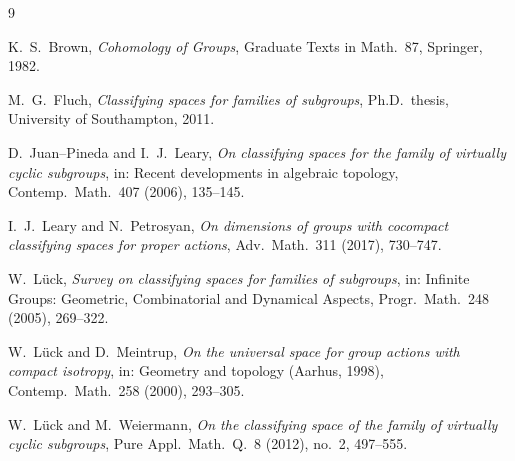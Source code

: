 \documentclass{amsart}
\theoremstyle{definition}
\begin{document}
\begin{thebibliography}{9}

 K.~S.~Brown, \emph{Cohomology of Groups}, Graduate Texts in Math.\ 87,
Springer, 1982.

 M.~G.~Fluch, \emph{Classifying spaces for families of subgroups},
Ph.D.\ thesis, University of Southampton, 2011.

 D.~Juan--Pineda and I.~J.~Leary,
\emph{On classifying spaces for the family of virtually cyclic subgroups},
in: Recent developments in algebraic topology, Contemp.\ Math.\ 407 (2006), 135--145.

 I.~J.~Leary and N.~Petrosyan,
\emph{On dimensions of groups with cocompact classifying spaces for proper actions},
Adv.\ Math.\ 311 (2017), 730--747.

 W.~Lück,
\emph{Survey on classifying spaces for families of subgroups},
in: Infinite Groups: Geometric, Combinatorial and Dynamical Aspects,
Progr.\ Math.\ 248 (2005), 269--322.

 W.~Lück and D.~Meintrup,
\emph{On the universal space for group actions with compact isotropy},
in: Geometry and topology (Aarhus, 1998), Contemp.\ Math.\ 258 (2000), 293--305.

 W.~Lück and M.~Weiermann,
\emph{On the classifying space of the family of virtually cyclic subgroups},
Pure Appl.\ Math.\ Q.\ 8 (2012), no.~2, 497--555.

\end{thebibliography}
\end{document}

